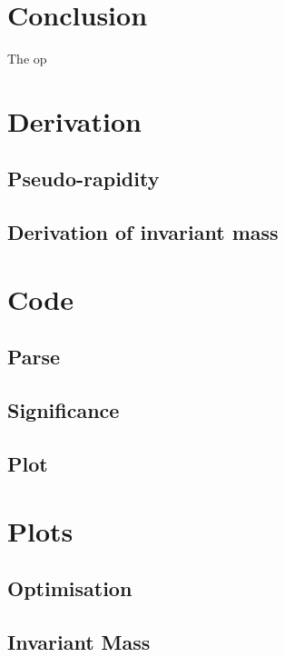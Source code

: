 \documentclass{article}
\begin{document}
\section{Conclusion}
The op


\appendix
\section{Derivation}
\subsection{Pseudo-rapidity}
\subsection{Derivation of invariant mass}
\section{Code}
\subsection{Parse}

\subsection{Significance}

\subsection{Plot}

\section{Plots}
\subsection{Optimisation}
\subsection{Invariant Mass}
\end{document}
